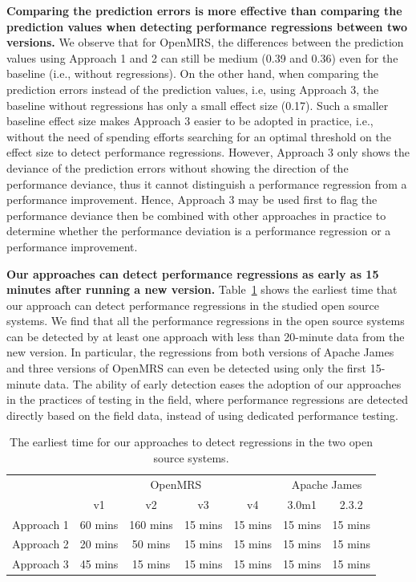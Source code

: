 \noindent\textbf{Comparing the prediction errors is more effective than comparing the prediction values when detecting performance regressions between two versions.}
We observe that for OpenMRS, the differences between the prediction values using Approach 1 and 2 can still be medium (0.39 and 0.36) even for the baseline (i.e., without regressions).
On the other hand, when comparing the prediction errors instead of the prediction values, i.e, using Approach 3, the baseline without regressions has only a small effect size (0.17).
Such a smaller baseline effect size makes Approach 3 easier to be adopted in practice, i.e., without the need of spending efforts searching for an optimal threshold on the effect size to detect performance regressions. However, Approach 3 only shows the deviance of the prediction errors without showing the direction of the performance deviance, thus it cannot distinguish a performance regression from a performance improvement. Hence, Approach 3 may be used first to flag the performance deviance then be combined with other approaches in practice to determine whether the performance deviation is a performance regression or a performance improvement.


\noindent\textbf{Our approaches can detect performance regressions as early as 15 minutes after running a new version.}
Table~\ref{tab:howearly} shows the earliest time that our approach can detect performance regressions in the studied open source systems. We find that all the performance regressions in the open source systems can be detected by at least one approach with less than 20-minute data from the new version. In particular, the regressions from both versions of Apache James and three versions of OpenMRS can even be detected using only the first 15-minute data. The ability of early detection eases the adoption of our approaches in the practices of testing in the field, where performance regressions are detected directly based on the field data, instead of using dedicated performance testing. 
 
\begin{table}[tbh]
  \centering
  \caption{The earliest time for our approaches to detect regressions in the two open source systems.}
    \begin{tabular}{c|cccc|cc}
    \hline
          & \multicolumn{4}{c|}{OpenMRS}  & \multicolumn{2}{c}{Apache James} \\
\cline{2-7}          & v1    & v2    & v3    & v4    & 3.0m1 & 2.3.2 \\
    \hline
    Approach 1 & 60 mins & 160 mins & 15 mins & 15 mins & 15 mins & 15 mins \\
    Approach 2 & 20 mins & 50 mins & 15 mins & 15 mins & 15 mins & 15 mins \\
    Approach 3 & 45 mins & 15 mins & 15 mins & 15 mins & 15 mins & 15 mins \\
    \hline
    \end{tabular}%
  \label{tab:howearly}%
\end{table}%



